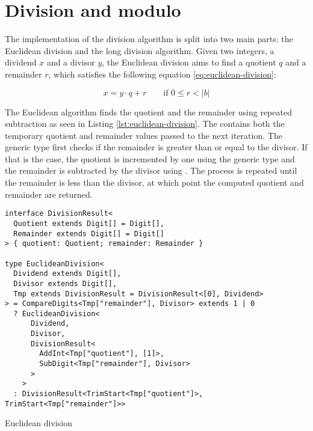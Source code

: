 \section{Division and modulo}

The implementation of the division algorithm is split into two main parts: the Euclidean division and the long division algorithm. Given two integers, a dividend $x$ and a divisor $y$, the Euclidean division aims to find a quotient $q$ and a remainder $r$, which satisfies the following equation \ref{eq:euclidean-division}:

\begin{equation}\label{eq:euclidean-division}
  x = y\cdot q + r \qquad \text{if } 0 \le r < |b|
\end{equation}

The Euclidean algorithm finds the quotient and the remainder using repeated subtraction as seen in Listing \ref{lst:euclidean-division}. The  contains both the temporary quotient and remainder values passed to the next iteration. The  generic type first checks if the remainder is greater than or equal to the divisor. If that is the case, the quotient is incremented by one using the  generic type and the remainder is subtracted by the divisor using . The process is repeated until the remainder is less than the divisor, at which point the computed quotient and remainder are returned.

\begin{listing}[ht]
  \begin{verbatim}
interface DivisionResult<
  Quotient extends Digit[] = Digit[],
  Remainder extends Digit[] = Digit[]
> { quotient: Quotient; remainder: Remainder }

type EuclideanDivision<
  Dividend extends Digit[],
  Divisor extends Digit[],
  Tmp extends DivisionResult = DivisionResult<[0], Dividend>
> = CompareDigits<Tmp["remainder"], Divisor> extends 1 | 0
  ? EuclideanDivision<
      Dividend,
      Divisor,
      DivisionResult<
        AddInt<Tmp["quotient"], [1]>,
        SubDigit<Tmp["remainder"], Divisor>
      >
    >
  : DivisionResult<TrimStart<Tmp["quotient"]>, TrimStart<Tmp["remainder"]>>
\end{verbatim}
  \caption{Euclidean division}\label{lst:euclidean-division}
\end{listing}

